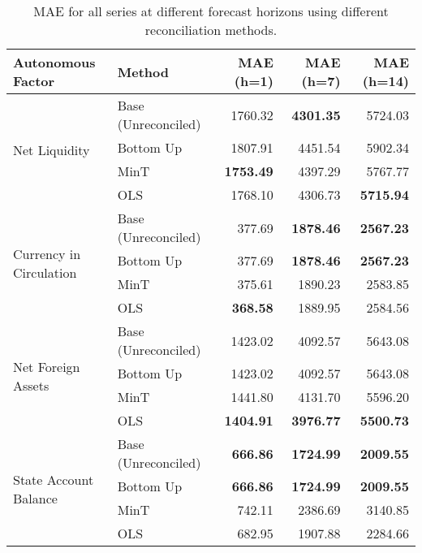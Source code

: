 \begin{table}[ht]
\centering
\begin{tabular}{l|l|rrr}
  \hline\hline
Autonomous Factor & Method & MAE (h=1) & MAE (h=7) & MAE (h=14) \\ 
  \hline
\multirow{4}{*}{Net Liquidity}&Base (Unreconciled) & 1760.32 & \textbf{4301.35} & 5724.03 \\ 
 & Bottom Up & 1807.91 & 4451.54 & 5902.34 \\ 
 & MinT & \textbf{1753.49} & 4397.29 & 5767.77 \\ 
  &OLS & 1768.10 & 4306.73 & \textbf{5715.94} \\ 
  \hline
\multirow{4}{*}{Currency in Circulation}  &Base (Unreconciled) & 377.69 & \textbf{1878.46} &\textbf{ 2567.23} \\ 
  &Bottom Up & 377.69 & \textbf{1878.46} & \textbf{2567.23 }\\ 
  &MinT & 375.61 & 1890.23 & 2583.85 \\ 
  &OLS & \textbf{368.58} & 1889.95 & 2584.56 \\ 
  \hline
\multirow{4}{*}{Net Foreign Assets}  &Base (Unreconciled) & 1423.02 & 4092.57 & 5643.08 \\ 
  &Bottom Up & 1423.02 & 4092.57 & 5643.08 \\ 
  &MinT & 1441.80 & 4131.70 & 5596.20 \\ 
  &OLS & \textbf{1404.91} & \textbf{3976.77} & \textbf{5500.73} \\ 
  \hline
\multirow{4}{*}{State Account Balance}  &Base (Unreconciled) & \textbf{666.86} &\textbf{ 1724.99} & \textbf{2009.55} \\ 
  &Bottom Up & \textbf{666.86} & \textbf{1724.99 }& \textbf{2009.55} \\ 
  &MinT & 742.11 & 2386.69 & 3140.85 \\ 
  &OLS & 682.95 & 1907.88 & 2284.66 \\ 
   \hline\hline
\end{tabular}
\caption{MAE for all series at different forecast horizons using different reconciliation methods.} 
\label{tab:reco}
\end{table}

